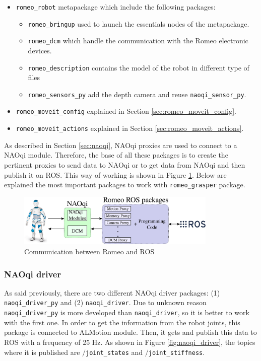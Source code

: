 \documentclass[12pt,a4paper,final,twoside,openright]{report}
\begin{document}
\begin{itemize}
\item \texttt{romeo\_robot} metapackage which include the following packages:
\begin{itemize}
\item \texttt{romeo\_bringup} used to launch the essentials nodes of the metapackage.
\item \texttt{romeo\_dcm} which handle the communication with the Romeo electronic devices.
\item \texttt{romeo\_description} contains the model of the robot in different type of files
\item \texttt{romeo\_sensors\_py} add the depth camera and reuse \texttt{naoqi\_sensor\_py}.
\end{itemize}
\item \texttt{romeo\_moveit\_config} explained in Section \ref{sec:romeo_moveit_config}.
\item \texttt{romeo\_moveit\_actions} explained in Section \ref{sec:romeo_moveit_actions}.
\end{itemize}

As described in Section \ref{sec:naoqi}, NAOqi proxies are used to connect to a NAOqi module. Therefore, the base of all these packages is to create the pertinent proxies to send data to NAOqi or to get data from NAOqi and then publish it on ROS. This way of working is shown in Figure \ref{fig:Romeo-ROS}. Below are explained the most important packages to work with \texttt{romeo\_grasper} package.

\begin{figure}[h]
\centering
\includegraphics[width=0.85\textwidth]{images/Romeo-ROS.eps}
\caption{Communication between Romeo and ROS\label{fig:Romeo-ROS}}
\end{figure}

\subsubsection{NAOqi driver}

As said previously, there are two different NAOqi driver packages: (1) \texttt{naoqi\_driver\_py} and (2) \texttt{naoqi\_driver}. Due to unknown reason \texttt{naoqi\_driver\_py} is more developed than \texttt{naoqi\_driver}, so it is better to work with the first one. In order to get the information from the robot joints, this package is connected to ALMotion module. Then, it gets and publish this data to ROS with a frequency of 25 Hz. As shown in Figure \ref{fig:naoqi_driver}, the topics where it is published are \texttt{$/$joint\_states} and \texttt{$/$joint\_stiffness}.
\end{document}

